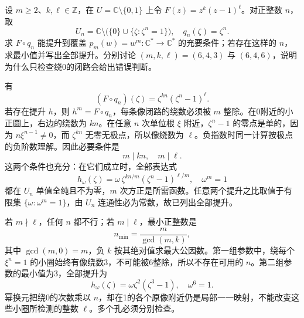 \begin{exercise}\label{b3:ex:11-2}
设 \(m\ge2\)、\(k,\ell\in\mathbb Z\)，在 \(U=\mathbb C\setminus\{0,1\}\) 上令 \(F(z)=z^k(z-1)^\ell\)。对正整数 \(n\)，取
\[
 U_n=\mathbb C\setminus\bigl(\{0\}\cup\{\zeta:\zeta^n=1\}\bigr),
 \quad q_n(\zeta)=\zeta^n.
\]
求 \(F\circ q_n\) 能提升到覆盖 \(p_m(w)=w^m:\mathbb C^*\to\mathbb C^*\) 的充要条件；若存在这样的 \(n\)，求最小值并写出全部提升。分别讨论 \((m,k,\ell)=(6,4,3)\) 与 \((6,4,6)\)，说明为什么只检查绕0的闭路会给出错误判断。
\end{exercise}
\begin{solution}
有
\[
 (F\circ q_n)(\zeta)=\zeta^{kn}(\zeta^n-1)^\ell.
\]
若存在提升 \(h\)，则 \(h^m=F\circ q_n\)，每条像闭路的绕数必须被 \(m\) 整除。在0附近的小正圆上，右边的绕数为 \(kn\)。在任意 \(n\) 次单位根 \(\xi\) 附近，\(\zeta^n-1\) 的零点是单的，因为 \(n\xi^{n-1}\ne0\)，而 \(\zeta^{kn}\) 无零无极点，所以像绕数为 \(\ell\)。负指数时同一计算按极点的负阶数理解。因此必要条件是
\[
 m\mid kn,\quad m\mid\ell.
\]
这两个条件也充分：在它们成立时，全部表达式
\[
 h_\omega(\zeta)=\omega\,
       \zeta^{kn/m}(\zeta^n-1)^{\ell/m},\quad \omega^m=1
\]
都在 \(U_n\) 单值全纯且不为零，\(m\) 次方正是所需函数。任意两个提升之比取值于有限集 \(\{\omega:\omega^m=1\}\)，由 \(U_n\) 连通性必为常数，故已列出全部提升。

若 \(m\nmid\ell\)，任何 \(n\) 都不行；若 \(m\mid\ell\)，最小正整数是
\[
 n_{\min}=\frac{m}{\gcd(m,k)},
\]
其中 \(\gcd(m,0)=m\)，负 \(k\) 按其绝对值求最大公因数。第一组参数中，绕每个 \(\xi^n=1\) 的小圈始终有像绕数3，不可能被6整除，所以不存在可用的 \(n\)。第二组参数的最小值为3，全部提升为
\[
 h_\omega(\zeta)=\omega\zeta^2(\zeta^3-1),\quad \omega^6=1.
\]
幂换元把绕0的次数乘以 \(n\)，却在1的各个原像附近仍是局部一一映射，不能改变这些小圈所检测的整数 \(\ell\)。多个孔必须分别检查。
\end{solution}

